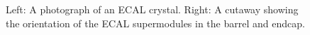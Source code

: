 \begin{figure}[H]
    \centering
    \caption{Left: A photograph of an ECAL crystal. Right: A cutaway showing the orientation of the ECAL supermodules in the barrel and endcap.}
    \label{fig:ECAL}
\end{figure}

